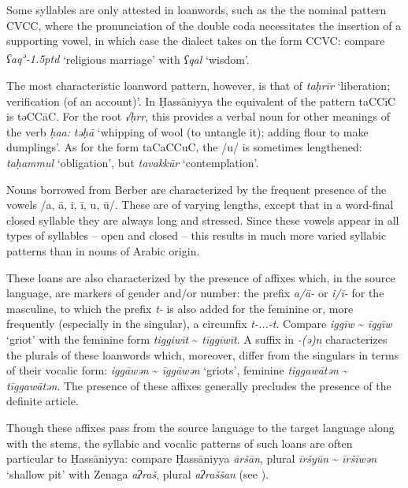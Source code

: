 \documentclass[output=paper]{langsci/langscibook}
\begin{document}
Some syllables are only attested in loanwords, such as the the nominal pattern CVCC, where the pronunciation of the double coda necessitates the insertion of a supporting vowel, in which case the dialect takes on the form CCVC: compare \textit{ʕaq\kern 0.5pt\textsuperscript{ə}\kern -1.5ptd} ‘religious marriage’ with \textit{ʕqal} ‘wisdom’.

The most characteristic loanword pattern, however, is that of \textit{taḥrīr} ‘liberation; verification (of an account)’. In Ḥassāniyya the equivalent of the pattern taCCīC is təCCāC. For the root \textit{√ḥrr}, this provides a verbal noun for other meanings of the verb \textit{ḥa{\R}{\R}a{\R}:} \textit{təḥ{\R}ā{\R}} ‘whipping of wool (to untangle it); adding flour to make dumplings’. As for the form taCaCCuC, the /u/ is sometimes lengthened: \textit{taḥammul} ‘obligation’, but \textit{tavakkūr} ‘contemplation’.


Nouns borrowed from Berber are characterized by the frequent presence of the vowels /a, ā, i, ī, u, ū/. These are of varying lengths, except that in a word-final closed syllable they are always long and stressed. Since these vowels appear in all types of syllables – open and closed – this results in much more varied syllabic patterns than in nouns of Arabic origin. 

These loans are also characterized by the presence of affixes which, in the source language, are markers of gender and/or number: the prefix \textit{a/ā-} or \textit{i/ī-} for the masculine, to which the prefix \textit{t-} is also added for the feminine or, more frequently (especially in the singular), a circumfix \textit{t-...-t}. Compare \textit{iggīw} \~{} \textit{īggīw} ‘griot’ with the feminine form \textit{tiggiwīt} \~{} \textit{tīggīwīt}. A suffix in \textit{-(ə)n} characterizes the plurals of these loanwords which, moreover, differ from the singulars in terms of their vocalic form: \textit{iggāwən} \~{} \textit{īggāwən} ‘griots’, feminine \textit{tiggawātən} \~{} \textit{tīggawātən}. The presence of these affixes generally precludes the presence of the definite article.

Though these affixes pass from the source language to the target language along with the stems, the syllabic and vocalic patterns of such loans are often particular to Ḥassāniyya: compare Ḥassāniyya \textit{āršān}, plural \textit{īršyūn} \~{} \textit{īršīwən} ‘shallow pit’ with Zenaga \textit{aʔraš}, plural \textit{aʔraššan} (see \citealt{Taine-Cheikh1997Zenaga}).
\end{document}
